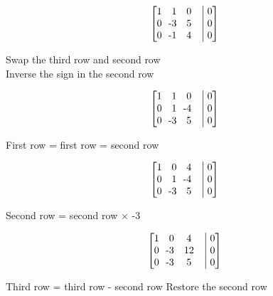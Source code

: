 \documentclass[11pt]{article}
\begin{document}
\vspace*{-\baselineskip}
\begin{align*}
    \begin{bmatrix}
    1 & 1 & 0 &\bigm| 0\\
    0 & \llap{-}3 & 5 &\bigm|  0\\
    0 & \llap{-}1 & 4 &\bigm| 0
    \end{bmatrix}
\end{align*}
\begin{center}
Swap the third row and second row\\
Inverse the sign in the second row
\end{center}
\vspace*{-\baselineskip}
\begin{align*}
    \begin{bmatrix}
    1 & 1 & 0 &\bigm| 0\\
    0 & 1 & \llap{-}4 &\bigm| 0\\
    0 & \llap{-}3 & 5 &\bigm|  0\\
    \end{bmatrix}
\end{align*}
\begin{center}
First row = first row = second row
\end{center}
\vspace*{-\baselineskip}
\begin{align*}
    \begin{bmatrix}
    1 & 0 & 4 &\bigm| 0\\
    0 & 1 & \llap{-}4 &\bigm| 0\\
    0 & \llap{-}3 & 5 &\bigm|  0\\
    \end{bmatrix}
\end{align*}
\begin{center}
Second row = second row $\times$ -3
\end{center}
\vspace*{-\baselineskip}
\begin{align*}
    \begin{bmatrix}
    1 & 0 & 4 &\bigm| 0\\
    0 & \llap{-}3 & 12 &\bigm| 0\\
    0 & \llap{-}3 & 5 &\bigm|  0\\
    \end{bmatrix}
\end{align*}
\begin{center}
Third row = third row - second row
Restore the second row
\end{center}
\end{document}
